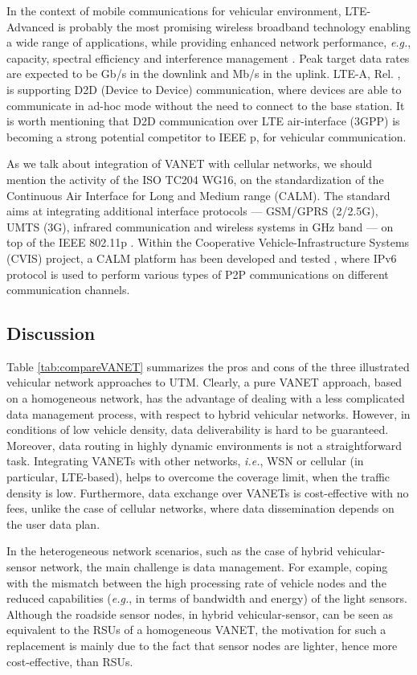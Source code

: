 \documentclass[10pt,onecolumn]{article}
\begin{document}
In the context of mobile communications for vehicular environment, LTE-Advanced is probably the most promising wireless broadband technology enabling a wide range of applications, while providing enhanced network performance, \textit{e.g.}, capacity, spectral efficiency and interference management \cite{Ali2013}. Peak target data rates are expected to be  Gb/s in the downlink and  Mb/s in the uplink. LTE-A, Rel. , is supporting D2D (Device to Device) communication, where devices are able to communicate in ad-hoc mode without the need to connect to the base station. It is worth mentioning that D2D communication over LTE air-interface (3GPP) is becoming a strong potential competitor to IEEE p, for vehicular communication.

As we talk about integration of VANET with cellular networks, we should mention the activity of the ISO TC204 WG16, on the standardization of the Continuous Air Interface for Long and Medium range (CALM). The standard aims at integrating additional interface protocols --- GSM/GPRS (2/2.5G), UMTS (3G), infrared communication and wireless systems in  GHz band --- on top of the IEEE 802.11p \cite{calm01,calm03}.
Within the Cooperative Vehicle-Infrastructure Systems (CVIS) project, a CALM platform has been developed and tested \cite{cvis}, where IPv6 protocol is used to perform various types of P2P communications on different communication channels.

\subsection{Discussion}
Table \ref{tab:compareVANET} summarizes the pros and cons of the three illustrated vehicular network approaches to UTM. Clearly, a pure VANET approach, based on a homogeneous network, has the advantage of dealing with a less complicated data management process, with respect to hybrid vehicular networks. However, in conditions of low vehicle density, data deliverability is hard to be guaranteed. 
Moreover, data routing in highly dynamic environments is not a straightforward task. Integrating VANETs with other networks, \textit{i.e.}, WSN or cellular (in particular, LTE-based), helps to overcome the coverage limit, when the traffic density is low. Furthermore, data exchange over VANETs is cost-effective with no fees, unlike the case of cellular networks, where data dissemination depends on the user data plan.

In the heterogeneous network scenarios, such as the case of hybrid vehicular-sensor network, the main challenge is data management. For example, coping with the mismatch between the high processing rate of vehicle nodes and the reduced capabilities (\textit{e.g.}, in terms of bandwidth and energy) of the light sensors.  
Although the roadside sensor nodes, in hybrid vehicular-sensor, can be seen as equivalent to the RSUs of a homogeneous VANET, the motivation for such a replacement is mainly due to the fact that sensor nodes are lighter, hence more cost-effective, than RSUs.
\end{document}

